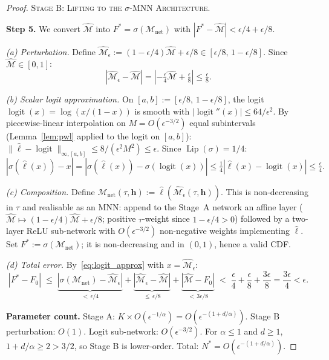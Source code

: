 \begin{proof}
\medskip\noindent\textsc{Stage B: Lifting to the $\sigma$-MNN Architecture.}

\textbf{Step 5.}
We convert $\hat{\mathcal{M}}$ into $F^* = \sigma(\mathcal{M}_{\mathrm{net}})$
with $|F^* - \hat{\mathcal{M}}| < \epsilon/4 + \epsilon/8$.

\emph{(a) Perturbation.}
Define $\hat{\mathcal{M}}_\epsilon := (1-\epsilon/4)\hat{\mathcal{M}} + \epsilon/8 \in [\epsilon/8,\,1-\epsilon/8]$.
Since $\hat{\mathcal{M}} \in [0,1]$:
\begin{equation}
|\hat{\mathcal{M}}_\epsilon - \hat{\mathcal{M}}|
= |{-}\tfrac{\epsilon}{4}\hat{\mathcal{M}} + \tfrac{\epsilon}{8}|
\leq \tfrac{\epsilon}{8}.
\label{eq:perturb}
\end{equation}

\emph{(b) Scalar logit approximation.}
On $[a,b] := [\epsilon/8,\,1-\epsilon/8]$, the logit
$\operatorname{logit}(x) = \log(x/(1-x))$ is smooth with
$|\operatorname{logit}''(x)| \leq 64/\epsilon^2$.
By piecewise-linear interpolation on $M = O(\epsilon^{-3/2})$ equal subintervals
(Lemma~\ref{lem:pwl} applied to the logit on $[a,b]$):
$\|\hat{\ell} - \operatorname{logit}\|_{\infty,[a,b]} \leq 8/(\epsilon^2 M^2) \leq \epsilon$.
Since $\operatorname{Lip}(\sigma) = 1/4$:
\begin{equation}
|\sigma(\hat{\ell}(x)) - x|
= |\sigma(\hat{\ell}(x)) - \sigma(\operatorname{logit}(x))|
\leq \tfrac{1}{4}|\hat{\ell}(x) - \operatorname{logit}(x)|
\leq \tfrac{\epsilon}{4}.
\label{eq:logit_approx}
\end{equation}

\emph{(c) Composition.}
Define $\mathcal{M}_{\mathrm{net}}(\tau,\boldsymbol{h}) :=
\hat{\ell}(\hat{\mathcal{M}}_\epsilon(\tau,\boldsymbol{h}))$.
This is non-decreasing in $\tau$ and realisable as an MNN:
append to the Stage~A network an affine layer
($\hat{\mathcal{M}} \mapsto (1-\epsilon/4)\hat{\mathcal{M}} + \epsilon/8$; positive
$\tau$-weight since $1-\epsilon/4>0$) followed by a two-layer ReLU sub-network
with $O(\epsilon^{-3/2})$ non-negative weights implementing $\hat{\ell}$.
Set $F^* := \sigma(\mathcal{M}_{\mathrm{net}})$; it is non-decreasing and in $(0,1)$,
hence a valid CDF.

\emph{(d) Total error.}
By~\eqref{eq:logit_approx} with $x = \hat{\mathcal{M}}_\epsilon$:
\[
|F^* - F_0|
\;\leq\;
\underbrace{|\sigma(\mathcal{M}_{\mathrm{net}}) - \hat{\mathcal{M}}_\epsilon|}_{<\,\epsilon/4}
+ \underbrace{|\hat{\mathcal{M}}_\epsilon - \hat{\mathcal{M}}|}_{\leq\,\epsilon/8}
+ \underbrace{|\hat{\mathcal{M}} - F_0|}_{<\,3\epsilon/8}
\;<\; \frac{\epsilon}{4} + \frac{\epsilon}{8} + \frac{3\epsilon}{8}
= \frac{3\epsilon}{4} < \epsilon.
\]

\textbf{Parameter count.}
Stage A: $K\times O(\epsilon^{-1/\alpha}) = O(\epsilon^{-(1+d/\alpha)})$.
Stage B perturbation: $O(1)$.
Logit sub-network: $O(\epsilon^{-3/2})$.
For $\alpha \leq 1$ and $d \geq 1$, $1 + d/\alpha \geq 2 > 3/2$,
so Stage B is lower-order. Total: $N^* = O(\epsilon^{-(1+d/\alpha)})$.
\end{proof}

